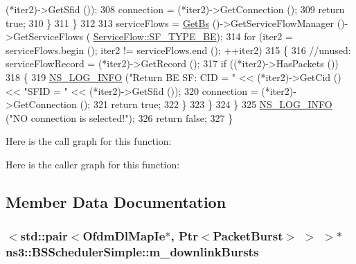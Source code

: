 \begin{DoxyCode}
      (*iter2)->GetSfid ());
308               connection = (*iter2)->GetConnection ();
309               \textcolor{keywordflow}{return} \textcolor{keyword}{true};
310             \}
311         \}
312 
313       serviceFlows = \hyperlink{classns3_1_1BSScheduler_a8b09065ac8f74cb35446af55128e41c7}{GetBs} ()->GetServiceFlowManager ()->GetServiceFlows (
      \hyperlink{classns3_1_1ServiceFlow_a7990ba10be1e098328fd1e6382a26235af93a8bd8fce654e688f957f6f362e5c7}{ServiceFlow::SF\_TYPE\_BE});
314       \textcolor{keywordflow}{for} (iter2 = serviceFlows.begin (); iter2 != serviceFlows.end (); ++iter2)
315         \{
316           \textcolor{comment}{//unused: serviceFlowRecord = (*iter2)->GetRecord ();}
317           \textcolor{keywordflow}{if} ((*iter2)->HasPackets ())
318             \{
319               \hyperlink{group__logging_gafbd73ee2cf9f26b319f49086d8e860fb}{NS\_LOG\_INFO} (\textcolor{stringliteral}{"Return BE SF: CID = "} << (*iter2)->GetCid () << \textcolor{stringliteral}{"SFID = "} << 
      (*iter2)->GetSfid ());
320               connection = (*iter2)->GetConnection ();
321               \textcolor{keywordflow}{return} \textcolor{keyword}{true};
322             \}
323         \}
324     \}
325   \hyperlink{group__logging_gafbd73ee2cf9f26b319f49086d8e860fb}{NS\_LOG\_INFO} (\textcolor{stringliteral}{"NO connection is selected!"});
326   \textcolor{keywordflow}{return} \textcolor{keyword}{false};
327 \}
\end{DoxyCode}


Here is the call graph for this function\+:




Here is the caller graph for this function\+:




\subsection{Member Data Documentation}
\subsubsection[{\texorpdfstring{m\+\_\+downlink\+Bursts}{m_downlinkBursts}}]{$<$std\+::pair$<${\bf Ofdm\+Dl\+Map\+Ie}$\ast$, {\bf Ptr}$<${\bf Packet\+Burst}$>$ $>$ $>$$\ast$ ns3\+::\+B\+S\+Scheduler\+Simple\+::m\+\_\+downlink\+Bursts\hspace{0.3cm}{\ttfamily [private]}}\hypertarget{classns3_1_1BSSchedulerSimple_a58431b0c06b4ae64220253afffdbfe06}{}\label{classns3_1_1BSSchedulerSimple_a58431b0c06b4ae64220253afffdbfe06}


